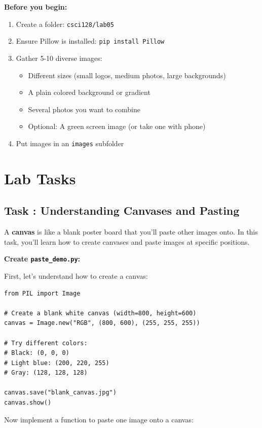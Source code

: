 \documentclass[11pt]{article}
\newcounter{taskcounter}
\newcommand{\task}[1]{%
    \stepcounter{taskcounter}%
    \subsection*{Task \thetaskcounter: #1}%
}
\begin{document}
\begin{setup}
\textbf{Before you begin:}
\begin{enumerate}
    \item Create a folder: \texttt{csci128/lab05}
    \item Ensure Pillow is installed: \texttt{pip install Pillow}
    \item Gather 5-10 diverse images:
    \begin{itemize}
        \item Different sizes (small logos, medium photos, large backgrounds)
        \item A plain colored background or gradient
        \item Several photos you want to combine
        \item Optional: A green screen image (or take one with phone)
    \end{itemize}
    \item Put images in an \texttt{images} subfolder
\end{enumerate}
\end{setup}

\section{Lab Tasks}

\task{Understanding Canvases and Pasting}

A \textbf{canvas} is like a blank poster board that you'll paste other images onto. In this task, you'll learn how to create canvases and paste images at specific positions.

\textbf{Create \texttt{paste\_demo.py}:}

First, let's understand how to create a canvas:

\begin{lstlisting}
from PIL import Image

# Create a blank white canvas (width=800, height=600)
canvas = Image.new("RGB", (800, 600), (255, 255, 255))

# Try different colors:
# Black: (0, 0, 0)
# Light blue: (200, 220, 255)
# Gray: (128, 128, 128)

canvas.save("blank_canvas.jpg")
canvas.show()
\end{lstlisting}

Now implement a function to paste one image onto a canvas:
\end{document}
